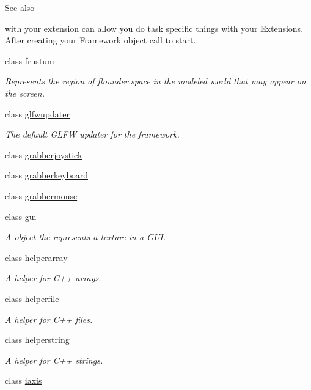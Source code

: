 \begin{DoxyCompactItemize}
\begin{DoxyCompactList}
\begin{DoxySeeAlso}{See also}
\end{DoxySeeAlso}
with your extension can allow you do task specific things with your Extensions. After creating your Framework object call  to start. \end{DoxyCompactList}\item 
class \hyperlink{classflounder_1_1frustum}{frustum}
\begin{DoxyCompactList}\small\item\em Represents the region of flounder.\+space in the modeled world that may appear on the screen. \end{DoxyCompactList}\item 
class \hyperlink{classflounder_1_1glfwupdater}{glfwupdater}
\begin{DoxyCompactList}\small\item\em The default G\+L\+FW updater for the framework. \end{DoxyCompactList}\item 
class \hyperlink{classflounder_1_1grabberjoystick}{grabberjoystick}
\item 
class \hyperlink{classflounder_1_1grabberkeyboard}{grabberkeyboard}
\item 
class \hyperlink{classflounder_1_1grabbermouse}{grabbermouse}
\item 
class \hyperlink{classflounder_1_1gui}{gui}
\begin{DoxyCompactList}\small\item\em A object the represents a texture in a G\+UI. \end{DoxyCompactList}\item 
class \hyperlink{classflounder_1_1helperarray}{helperarray}
\begin{DoxyCompactList}\small\item\em A helper for C++ arrays. \end{DoxyCompactList}\item 
class \hyperlink{classflounder_1_1helperfile}{helperfile}
\begin{DoxyCompactList}\small\item\em A helper for C++ files. \end{DoxyCompactList}\item 
class \hyperlink{classflounder_1_1helperstring}{helperstring}
\begin{DoxyCompactList}\small\item\em A helper for C++ strings. \end{DoxyCompactList}\item 
class \hyperlink{classflounder_1_1iaxis}{iaxis}

\end{DoxyCompactItemize}
